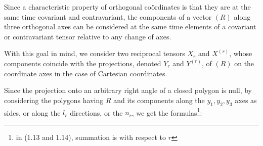 \documentclass{book}
\begin{document}
Since a characteristic property of orthogonal co\"ordinates is that they are at the same time covariant and contravariant, the components of a vector $(R)$ along three orthogonal axes can be considered at the same time elements of a covariant or contravariant tensor relative to any change of axes.

With this goal in mind, we consider two reciprocal tensors $X_r$ and $X^{(r)}$, whose components coincide with the projections, denoted $Y_r$ and $Y^{(r)}$, of $(R)$ on the coordinate axes in the case of Cartesian coordinates. 

Since the projection onto an arbitrary right angle of a closed polygon is null, by considering the polygons having $R$ and its components along the $y_1,y_2,y_3$ axes as sides, or along the $l_r$ directions, or the $n_r$, we get the formulas\footnote{in (1.13 and 1.14), summation is with respect to $r$}:
\end{document}
